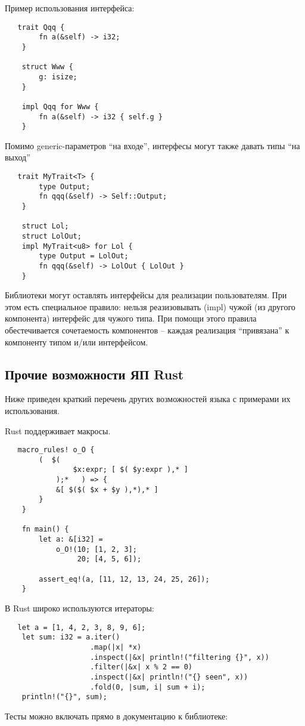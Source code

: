 \documentclass[10pt, a5paper]{article}
\begin{document}
Пример использования интерфейса:

\begin{verbatim}
   trait Qqq {
        fn a(&self) -> i32;
    }
    
    struct Www {
        g: isize;
    }
    
    impl Qqq for Www {
        fn a(&self) -> i32 { self.g }
    }\end{verbatim}
Помимо generic-параметров ``на входе'', интерфесы могут также давать типы ``на выход''

\begin{verbatim}
   trait MyTrait<T> {
        type Output;
        fn qqq(&self) -> Self::Output;
    }
    
    struct Lol;
    struct LolOut;
    impl MyTrait<u8> for Lol {
        type Output = LolOut;
        fn qqq(&self) -> LolOut { LolOut }
    }\end{verbatim}
Библиотеки могут оставлять интерфейсы для реализации пользователям. При этом есть специальное правило: нельзя реазизовывать (impl) чужой (из другого компонента) интерфейс для чужого типа. При помощи этого правила обестечивается сочетаемость компонентов -- каждая реализация ``привязана'' к компоненту типом и/или интерфейсом.

\subsection*{Прочие возможности ЯП Rust}

Ниже приведен краткий перечень других возможностей языка с примерами их использования.

Rust поддерживает макросы.

\begin{verbatim}
   macro_rules! o_O {
        (  $(
                $x:expr; [ $( $y:expr ),* ]
            );*   ) => {
            &[ $($( $x + $y ),*),* ]
        }
    }
    
    fn main() {
        let a: &[i32] = 
            o_O!(10; [1, 2, 3];
                 20; [4, 5, 6]);
    
        assert_eq!(a, [11, 12, 13, 24, 25, 26]); 
    }\end{verbatim}
В Rust широко используются итераторы:

\begin{verbatim}
   let a = [1, 4, 2, 3, 8, 9, 6];
    let sum: i32 = a.iter()
                    .map(|x| *x)
                    .inspect(|&x| println!("filtering {}", x))
                    .filter(|&x| x % 2 == 0)
                    .inspect(|&x| println!("{} seen", x))
                    .fold(0, |sum, i| sum + i);
    println!("{}", sum);\end{verbatim}
Тесты можно включать прямо в документацию к библиотеке:
\end{document}
